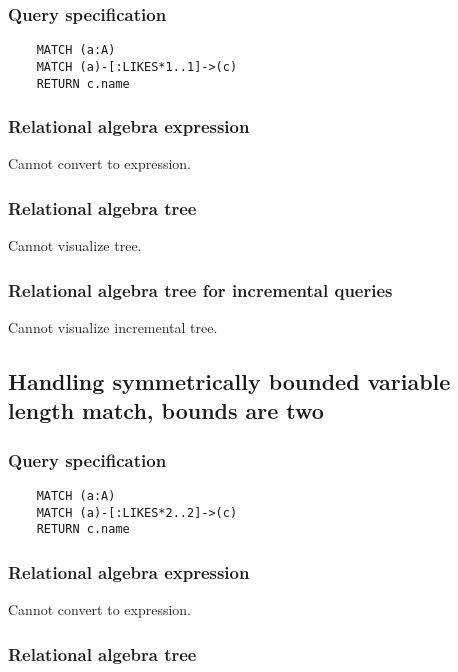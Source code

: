 	\subsubsection*{Query specification}

	\begin{lstlisting}
	MATCH (a:A)
	MATCH (a)-[:LIKES*1..1]->(c)
	RETURN c.name
	\end{lstlisting}


	\subsubsection*{Relational algebra expression}

	Cannot convert to expression.

	\subsubsection*{Relational algebra tree}

	Cannot visualize tree.

	\subsubsection*{Relational algebra tree for incremental queries}

	Cannot visualize incremental tree.
	\subsection{Handling symmetrically bounded variable length match, bounds are two}

	\subsubsection*{Query specification}

	\begin{lstlisting}
	MATCH (a:A)
	MATCH (a)-[:LIKES*2..2]->(c)
	RETURN c.name
	\end{lstlisting}


	\subsubsection*{Relational algebra expression}

	Cannot convert to expression.

	\subsubsection*{Relational algebra tree}


